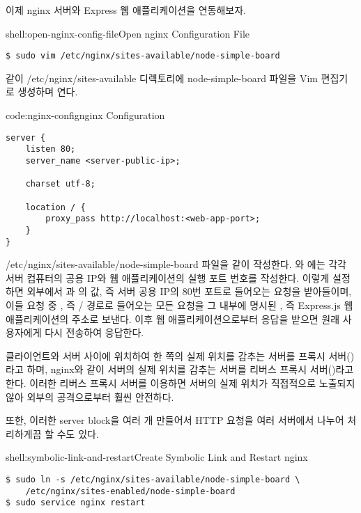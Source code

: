 이제 nginx 서버와 Express 웹 애플리케이션을 연동해보자.

\begin{shellenv}{shell:open-nginx-config-file}{Open nginx Configuration File}\begin{verbatim}
$ sudo vim /etc/nginx/sites-available/node-simple-board
\end{verbatim}
\end{shellenv}

\과 같이 /etc/nginx/sites-available 디렉토리에 node-simple-board 파일을 Vim 편집기로 생성하며 연다.

\begin{codeenv}{code:nginx-config}{nginx Configuration}\begin{verbatim}
server {
    listen 80;
    server_name <server-public-ip>;

    charset utf-8;

    location / {
        proxy_pass http://localhost:<web-app-port>;
    }
}
\end{verbatim}
\end{codeenv}

/etc/nginx/sites-available/node-simple-board 파일을 \와 같이 작성한다. 와 에는 각각 서버 컴퓨터의 공용 IP와 웹 애플리케이션의 실행 포트 번호를 작성한다. 이렇게 설정하면 외부에서 과 의 값, 즉 서버 공용 IP의 80번 포트로 들어오는 요청을 받아들이며, 이들 요청 중 , 즉 / 경로로 들어오는 모든 요청을 그 내부에 명시된 , 즉 Express.js 웹 애플리케이션의 주소로 보낸다. 이후 웹 애플리케이션으로부터 응답을 받으면 원래 사용자에게 다시 전송하여 응답한다.


클라이언트와 서버 사이에 위치하여 한 쪽의 실제 위치를 감추는 서버를 프록시 서버()라고 하며, nginx와 같이 서버의 실제 위치를 감추는 서버를 리버스 프록시 서버()라고 한다. 이러한 리버스 프록시 서버를 이용하면 서버의 실제 위치가 직접적으로 노출되지 않아 외부의 공격으로부터 훨씬 안전하다.

또한, 이러한 server block을 여러 개 만들어서 HTTP 요청을 여러 서버에서 나누어 처리하게끔 할 수도 있다.

\begin{shellenv}{shell:symbolic-link-and-restart}{Create Symbolic Link and Restart nginx}\begin{verbatim}
$ sudo ln -s /etc/nginx/sites-available/node-simple-board \
    /etc/nginx/sites-enabled/node-simple-board
$ sudo service nginx restart
\end{verbatim}
\end{shellenv}

